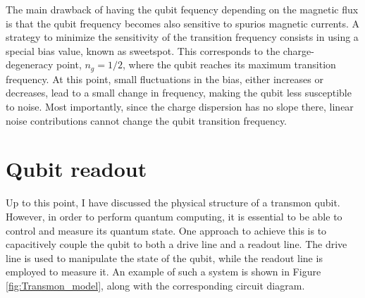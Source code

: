The main drawback of having the qubit fequency depending on the magnetic flux is that the qubit frequency becomes also sensitive to spurios magnetic currents.
A strategy to minimize the sensitivity of the transition frequency consists in using a special bias value, known as sweetspot. 
This corresponds to the charge-degeneracy point, $n_g = 1/2$, where the qubit reaches its maximum transition frequency. 
At this point, small fluctuations in the bias, either increases or decreases, lead to a small change in frequency, making the qubit less susceptible to noise.
Most importantly, since the charge dispersion has no slope there, linear noise contributions cannot change the qubit transition frequency.

\section{Qubit readout}\label{sec:cQED}
Up to this point, I have discussed the physical structure of a transmon qubit. 
However, in order to perform quantum computing, it is essential to be able to control and measure its quantum state.
One approach to achieve this is to capacitively couple the qubit to both a drive line and a readout line. 
The drive line is used to manipulate the state of the qubit, while the readout line is employed to measure it.
An example of such a system is shown in Figure \ref{fig:Transmon_model}, along with the corresponding circuit diagram.

